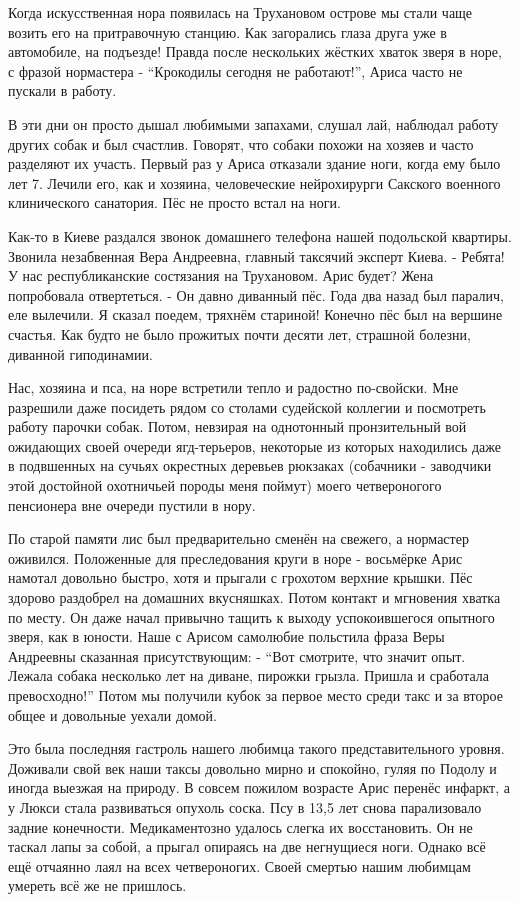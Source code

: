 Когда искусственная нора появилась на Трухановом острове мы стали чаще возить
его на притравочную станцию. Как загорались глаза друга уже в автомобиле, на
подъезде! Правда после нескольких жёстких хваток зверя в норе, с фразой
нормастера - \enquote{Крокодилы сегодня не работают!}, Ариса часто не пускали в работу.

В эти дни он просто дышал любимыми запахами, слушал лай, наблюдал работу других
собак и был счастлив. Говорят, что собаки похожи на хозяев и часто разделяют их
участь. Первый раз у Ариса отказали здание ноги, когда ему было лет 7. Лечили
его, как и хозяина, человеческие нейрохирурги Сакского военного клинического
санатория. Пёс не просто встал на ноги. 

Как-то в Киеве раздался звонок
домашнего телефона нашей подольской квартиры. Звонила незабвенная Вера
Андреевна, главный таксячий эксперт Киева. - Ребята! У нас республиканские
состязания на Трухановом. Арис будет? Жена попробовала отвертеться. - Он давно
диванный пёс. Года два назад был паралич, еле вылечили. Я сказал поедем,
тряхнём стариной! Конечно пёс был на вершине счастья. Как будто не было
прожитых почти десяти лет, страшной болезни, диванной гиподинамии. 

Нас, хозяина и пса, на норе встретили тепло и радостно по-свойски. Мне
разрешили даже посидеть рядом со столами судейской коллегии и посмотреть работу
парочки собак.  Потом, невзирая на однотонный пронзительный вой ожидающих своей
очереди ягд-терьеров, некоторые из которых находились даже в подвшенных на
сучьях окрестных деревьев рюкзаках (собачники - заводчики этой достойной
охотничьей породы меня поймут) моего четвероногого пенсионера вне очереди
пустили в нору.

По старой памяти лис был предварительно сменён на свежего, а нормастер
оживился. Положенные для преследования круги в норе - восьмёрке Арис намотал
довольно быстро, хотя и прыгали с грохотом верхние крышки. Пёс здорово
раздобрел на домашних вкусняшках. Потом контакт и мгновения хватка по месту. Он
даже начал привычно тащить к выходу успокоившегося опытного зверя, как в
юности. Наше с Арисом самолюбие польстила фраза Веры Андреевны сказанная
присутствующим: - \enquote{Вот смотрите, что значит опыт. Лежала собака
несколько лет на диване, пирожки грызла. Пришла и сработала превосходно!} Потом
мы получили кубок за первое место среди такс и за второе общее и довольные
уехали домой.

Это была последняя гастроль нашего любимца такого представительного уровня.
Доживали свой век наши таксы довольно мирно и спокойно, гуляя по Подолу и
иногда выезжая на природу. В совсем пожилом возрасте Арис перенёс инфаркт, а у
Люкси стала развиваться опухоль соска. Псу в 13,5 лет снова парализовало задние
конечности. Медикаментозно удалось слегка их восстановить. Он не таскал лапы за
собой, а прыгал опираясь на две негнущиеся ноги. Однако всё ещё отчаянно лаял
на всех четвероногих. Своей смертью нашим любимцам умереть всё же не пришлось.

